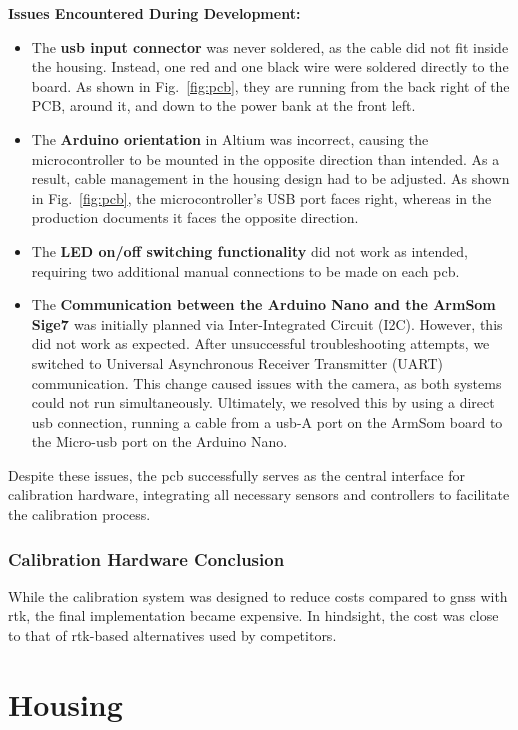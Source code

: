 \textbf{Issues Encountered During Development:}
\begin{itemize}
	\item The \textbf{\acrshort{usb} input connector} was never soldered, as the cable did not fit inside the housing. Instead, one red and one black wire were soldered directly to the board. As shown in Fig.~\ref{fig:pcb}, they are running from the back right of the PCB, around it, and down to the power bank at the front left.
	\item The \textbf{Arduino orientation} in Altium was incorrect, causing the microcontroller to be mounted in the opposite direction than intended. As a result, cable management in the housing design had to be adjusted. As shown in Fig.~\ref{fig:pcb}, the microcontroller’s USB port faces right, whereas in the production documents it faces the opposite direction.
	\item The \textbf{LED on/off switching functionality} did not work as intended, requiring two additional manual connections to be made on each \acrshort{pcb}.
	\item The \textbf{Communication between the Arduino Nano \cite{arduino_nano_dfrobot} and the ArmSom Sige7 \cite{armsom_sige7}} was initially planned via Inter-Integrated Circuit (I2C). However, this did not work as expected. After unsuccessful troubleshooting attempts, we switched to Universal Asynchronous Receiver Transmitter (UART) communication. This change caused issues with the camera, as both systems could not run simultaneously. Ultimately, we resolved this by using a direct \acrshort{usb} connection, running a cable from a \acrshort{usb}-A port on the ArmSom board to the Micro-\acrshort{usb} port on the Arduino Nano.
\end{itemize}

Despite these issues, the \acrshort{pcb} successfully serves as the central interface for calibration hardware, integrating all necessary sensors and controllers to facilitate the calibration process.

\subsubsection*{Calibration Hardware Conclusion}
While the calibration system was designed to reduce costs compared to \acrshort{gnss} with \acrshort{rtk}, the final implementation became expensive. In hindsight, the cost was close to that of \acrshort{rtk}-based alternatives used by competitors.

\section{Housing}
